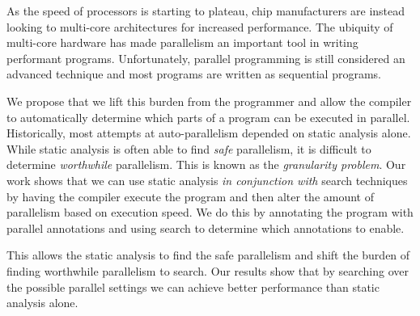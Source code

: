 As the speed of processors is starting to plateau, chip manufacturers are
instead looking to multi-core architectures for increased performance. The
ubiquity of multi-core hardware has made parallelism an important tool in
writing performant programs. Unfortunately, parallel programming is still
considered an advanced technique and most programs are written as sequential
programs.

We propose that we lift this burden from the programmer and allow the compiler
to automatically determine which parts of a program can be executed in
parallel. Historically, most attempts at auto-parallelism depended on static
analysis alone. While static analysis is often able to find \emph{safe}
parallelism, it is difficult to determine \emph{worthwhile} parallelism. This
is known as the \emph{granularity problem}. Our work shows that we can use
static analysis \emph{in conjunction with} search techniques by having the
compiler execute the program and then alter the amount of parallelism based on
execution speed.  We do this by annotating the program with parallel annotations
and using search to determine which annotations to enable.

This allows the static analysis to find the safe parallelism and shift the
burden of finding worthwhile parallelism to search. Our results show that by
searching over the possible parallel settings we can achieve better performance
than static analysis alone.
